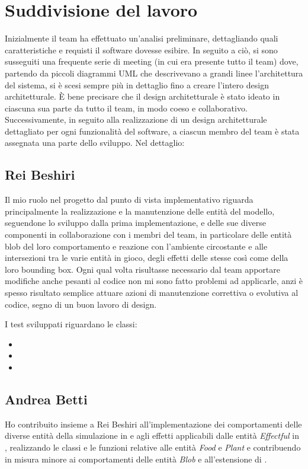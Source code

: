 \section{Suddivisione del lavoro}
Inizialmente il team ha effettuato un'analisi preliminare, dettagliando quali caratteristiche e requisti il software dovesse esibire. In seguito a ciò, si sono susseguiti una frequente serie di meeting (in cui era presente tutto il team) dove, partendo da piccoli diagrammi UML che descrivevano a grandi linee l'architettura del sistema, si è scesi sempre più in dettaglio fino a creare l'intero design architetturale. È bene precisare che il design architetturale è stato ideato in ciascuna sua parte da tutto il team, in modo coeso e collaborativo. Successivamente, in seguito alla realizzazione di un design architetturale dettagliato per ogni funzionalità del software, a ciascun membro del team è stata assegnata una parte dello sviluppo. Nel dettaglio:

\subsection{Rei Beshiri}
Il mio ruolo nel progetto dal punto di vista implementativo riguarda principalmente la realizzazione e la manutenzione delle entità del modello, seguendone lo sviluppo dalla prima implementazione, e delle sue diverse componenti in collaborazione con i membri del team, in particolare delle entità blob del loro comportamento e reazione con l'ambiente circostante e alle intersezioni tra le varie entità in gioco, degli effetti delle stesse così come della loro bounding box.
Ogni qual volta risultasse necessario dal team apportare modifiche anche pesanti al codice non mi sono fatto problemi ad applicarle, anzi è spesso risultato semplice attuare azioni di manutenzione correttiva o evolutiva al codice, segno di un buon lavoro di design.

I test sviluppati riguardano le classi:
\begin{itemize}
    \item {}
    \item {}
    \item {}
\end{itemize}

\subsection{Andrea Betti}
Ho contribuito insieme a Rei Beshiri all'implementazione dei comportamenti delle diverse entità della simulazione in  e agli effetti applicabili dalle entità \textit{Effectful} in , realizzando le classi e le funzioni relative alle entità \textit{Food} e \textit{Plant} e contribuendo in misura minore ai comportamenti delle entità \textit{Blob} e all'estensione di .

